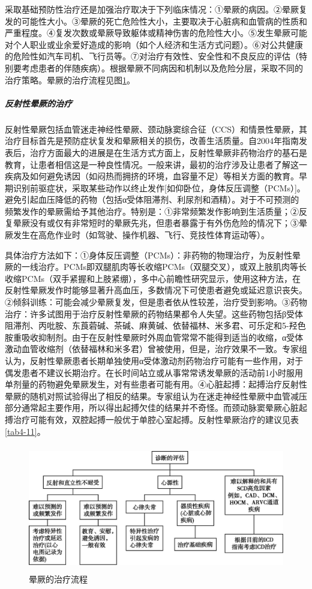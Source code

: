 采取基础预防性治疗还是加强治疗取决于下列临床情况：①晕厥的病因。②晕厥复发的可能性大小。③晕厥的死亡危险性大小，主要取决于心脏病和血管病的性质和严重程度。④复发次数或晕厥导致躯体或精神伤害的危险性大小。⑤发生晕厥可能对个人职业或业余爱好造成的影响（如个人经济和生活方式问题）。⑥对公共健康的危险性如汽车司机、飞行员等。⑦对治疗有效性、安全性和不良反应的评估（特别要考虑患者的伴随疾病）。根据晕厥不同病因和机制以及危险分层，采取不同的治疗策略。晕厥的治疗流程见图\ref{fig4-2}。

\subparagraph{反射性晕厥的治疗}

反射性晕厥包括血管迷走神经性晕厥、颈动脉窦综合征（CCS）和情景性晕厥，其治疗目标首先是预防症状复发和晕厥相关的损伤，改善生活质量。自2004年指南发表后，治疗方面最大的进展是在生活方式方面上，反射性晕厥非药物治疗的基石是教育，让患者相信这是一种良性情况。一般来讲，最初的治疗涉及让患者了解这一疾病及如何避免诱因（如闷热而拥挤的环境，血容量不足）等相关方面的教育。早期识别前驱症状，采取某些动作以终止发作{[}如仰卧位，身体反压调整（PCMs）{]}。避免引起血压降低的药物（包括α受体阻滞剂、利尿剂和酒精）。对于不可预测的频繁发作的晕厥需给予其他治疗。特别是：①非常频繁发作影响到生活质量；②反复晕厥没有或仅有非常短时的晕厥先兆，但患者暴露于有外伤危险的情况下；③晕厥发生在高危作业时（如驾驶、操作机器、飞行、竞技性体育运动等）。

具体治疗方法如下：①身体反压调整（PCMs）：非药物的物理治疗，为反射性晕厥的一线治疗。PCMs即双腿肌肉等长收缩PCMs（双腿交叉），或双上肢肌肉等长收缩PCMs（双手紧握和上肢紧绷），多中心前瞻性研究显示，使用这种方法，在反射性晕厥发作时能够显著升高血压，多数情况下可使患者避免或延迟意识丧失。②倾斜训练：可能会减少晕厥复发，但是患者依从性较差，治疗受到影响。③药物治疗：许多试图用于治疗反射性晕厥的药物结果都令人失望。这些药物包括β受体阻滞剂、丙吡胺、东莨菪碱、茶碱、麻黄碱、依替福林、米多君、可乐定和5-羟色胺重吸收抑制剂。由于在反射性晕厥时外周血管常常不能得到适当的收缩，α受体激动血管收缩剂（依替福林和米多君）曾被使用，但是，治疗效果不一致。专家组认为，反射性晕厥患者长期单独使用α受体激动剂药物治疗可能有一些作用，对于偶发患者不建议长期治疗。在长时间站立或从事常常诱发晕厥的活动前1小时服用单剂量的药物避免晕厥发生，对有些患者可能有用。④心脏起搏：起搏治疗反射性晕厥的随机对照试验得出了相反的结果。专家组认为在迷走神经性晕厥中血管减压部分通常起主要作用，所以得出起搏欠佳的结果并不奇怪。而颈动脉窦晕厥心脏起搏治疗可能有效，双腔起搏一般优于单腔心室起搏。反射性晕厥治疗的建议见表\ref{tab4-11}。

\begin{figure}[!htbp]
 \centering
 \includegraphics[width=4.82292in,height=2.16667in]{./images/Image00028.jpg}
 \captionsetup{justification=centering}
 \caption{晕厥的治疗流程}
 \label{fig4-2}
  \end{figure} 

